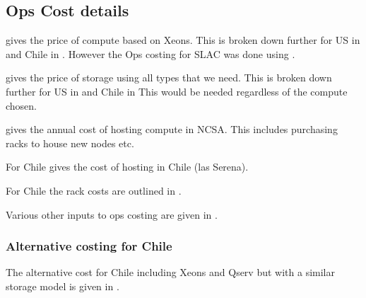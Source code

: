 \subsection{Ops Cost details}\label{sec:opsdetails}
 gives the price of compute based on Xeons.
This is broken down further for US in  and Chile in .
However the Ops costing for SLAC was done using .

 gives the price of storage using all  types that we need.
This is broken down further for US in  and Chile in 
This would be needed regardless of the compute chosen.









 gives the annual cost of hosting compute in NCSA. This includes purchasing racks to house
new nodes etc.


For Chile  gives the cost of hosting in Chile (las Serena).


For Chile the rack costs are outlined in .


Various other inputs to ops costing are given in .



\subsubsection{Alternative costing for Chile}
The alternative cost for Chile including Xeons and Qserv but with a similar storage model is given in .




